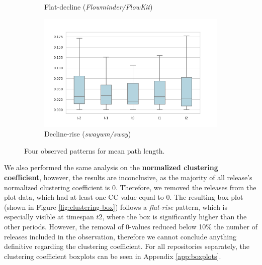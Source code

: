 \begin{figure}
\begin{subfigure}{0.49\textwidth}
        \caption{Flat-decline (\textit{Flowminder/FlowKit})}
        \label{fig:mean-path-pattern3}
    \end{subfigure}
    \begin{subfigure}{0.49\textwidth}
        \centering
        \includegraphics[width=\textwidth]{figures/quantitative/boxplots/swaywm_sway_decline-rise.png}
        \caption{Decline-rise (\textit{swaywm/sway})}
        \label{fig:mean-path-pattern4}
    \end{subfigure}
    \caption{Four observed patterns for mean path length.}
    \label{fig:box-mean-path-patterns}
\end{figure}

We also performed the same analysis on the \textbf{normalized clustering coefficient}, however, the results are inconclusive, as the majority of all release's normalized clustering coefficient is $0$. Therefore, we removed the releases from the plot data, which had at least one CC value equal to $0$. The resulting box plot (shown in Figure \ref{fig:clustering-box}) follows a \textit{flat-rise} pattern, which is especially visible at timespan $t2$, where the box is significantly higher than the other periods. However, the removal of 0-values reduced below 10\% the number of releases included in the observation, therefore we cannot conclude anything definitive regarding the clustering coefficient. For all repositories separately, the clustering coefficient boxplots can be seen in Appendix \ref{app:boxplots}. \\

